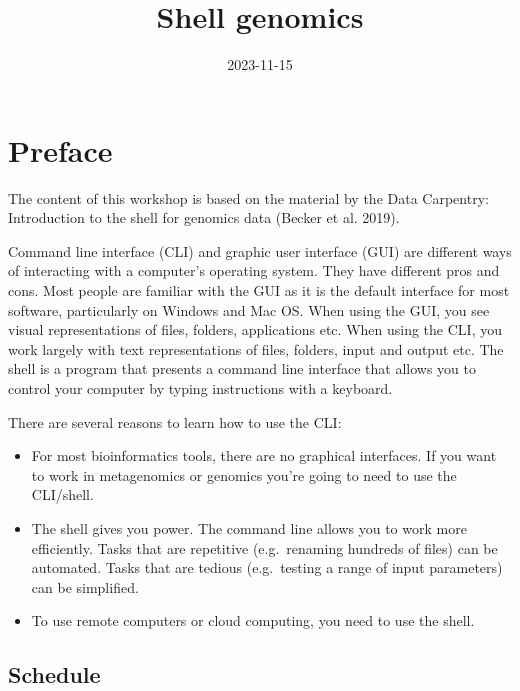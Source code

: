 \documentclass[
  letterpaper,
  DIV=11,
  numbers=noendperiod]{scrreprt}
\title{Shell genomics}
\author{}
\date{2023-11-15}
\renewcommand*\contentsname{Table of contents}
\newcommand\contentsname{Table of contents}
\begin{document}
\maketitle

\renewcommand*\contentsname{Table of contents}
{
\hypersetup{linkcolor=}
\setcounter{tocdepth}{2}
\tableofcontents
}


\chapter*{Preface}\label{preface}


The content of this workshop is based on the material by the Data
Carpentry: Introduction to the shell for genomics data (Becker et al.
2019).

Command line interface (CLI) and graphic user interface (GUI) are
different ways of interacting with a computer's operating system. They
have different pros and cons. Most people are familiar with the GUI as
it is the default interface for most software, particularly on Windows
and Mac OS. When using the GUI, you see visual representations of files,
folders, applications etc. When using the CLI, you work largely with
text representations of files, folders, input and output etc. The shell
is a program that presents a command line interface that allows you to
control your computer by typing instructions with a keyboard.

There are several reasons to learn how to use the CLI:

\begin{itemize}
\item
  For most bioinformatics tools, there are no graphical interfaces. If
  you want to work in metagenomics or genomics you're going to need to
  use the CLI/shell.
\item
  The shell gives you power. The command line allows you to work more
  efficiently. Tasks that are repetitive (e.g.~renaming hundreds of
  files) can be automated. Tasks that are tedious (e.g.~testing a range
  of input parameters) can be simplified.
\item
  To use remote computers or cloud computing, you need to use the shell.
\end{itemize}

\section*{\texorpdfstring{\textbf{Schedule}}{Schedule}}\label{schedule}
\end{document}
